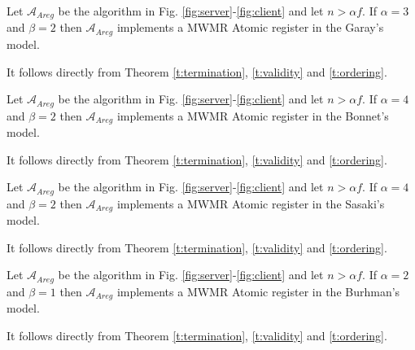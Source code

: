 \begin{theorem}\label{th:Garay}
	Let $\mathcal{A}_{Areg}$ be the algorithm in Fig. \ref{fig:server}-\ref{fig:client} and let $n > \alpha f$.
	If $\alpha = 3$ and $\beta = 2$ then $\mathcal{A}_{Areg}$ implements a MWMR Atomic register in the Garay's model.
	
\end{theorem}

\begin{proofT}
	It follows directly from Theorem \ref{t:termination}, \ref{t:validity} and \ref{t:ordering}.
	\renewcommand{\toto}{th:Garay}	
\end{proofT}

\begin{theorem}\label{th:Bonnet}
Let $\mathcal{A}_{Areg}$ be the algorithm in Fig. \ref{fig:server}-\ref{fig:client} and let $n > \alpha f$.
	If $\alpha = 4$ and $\beta = 2$ then $\mathcal{A}_{Areg}$ implements a MWMR Atomic register in the Bonnet's model.
\end{theorem}

\begin{proofT}
	It follows directly from Theorem \ref{t:termination}, \ref{t:validity} and \ref{t:ordering}.
	\renewcommand{\toto}{th:Bonnet}	
\end{proofT}

\begin{theorem}\label{th:Sasaki}
Let $\mathcal{A}_{Areg}$ be the algorithm in Fig. \ref{fig:server}-\ref{fig:client} and let $n > \alpha f$.
	If $\alpha = 4$ and $\beta = 2$ then $\mathcal{A}_{Areg}$ implements a MWMR Atomic register in the Sasaki's model.
\end{theorem}

\begin{proofT}
	It follows directly from Theorem \ref{t:termination}, \ref{t:validity} and \ref{t:ordering}.
	\renewcommand{\toto}{th:Sasaki}	
\end{proofT}

\begin{theorem}\label{th:Burhman}
Let $\mathcal{A}_{Areg}$ be the algorithm in Fig. \ref{fig:server}-\ref{fig:client} and let $n > \alpha f$.
	If $\alpha = 2$ and $\beta = 1$ then $\mathcal{A}_{Areg}$ implements a MWMR Atomic register in the Burhman's model.\end{theorem}

\begin{proofT}
	It follows directly from Theorem \ref{t:termination}, \ref{t:validity} and \ref{t:ordering}.
	\renewcommand{\toto}{th:Burhman}	
\end{proofT}

